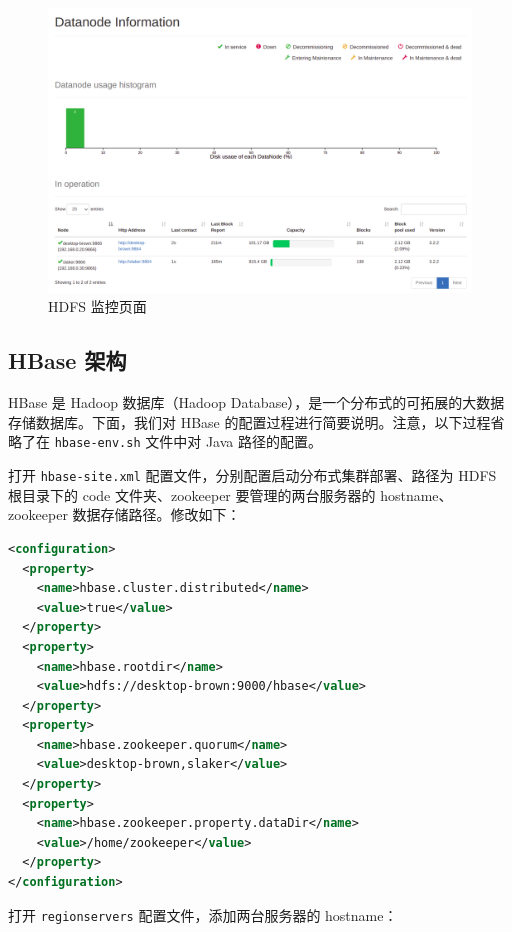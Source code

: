 \documentclass{ctexart}
\newcommand{\code}[1]{\colorbox{backcolor}{\lstinline|#1|}}
\begin{document}
    \begin{figure}[t]
        \centering
        \includegraphics[width=\textwidth]{src/archicture_hdfs-web}
        \caption{HDFS 监控页面}
        \label{fig:archicture_hdfs-web}
    \end{figure}

    \subsection{HBase 架构}\label{subsec:archicture_hbase}

    HBase 是 Hadoop 数据库（Hadoop Database），是一个分布式的可拓展的大数据存储数据库\cite{docs-hbase}。下面，我们对 HBase 的配置过程进行简要说明。注意，以下过程省略了在 \code{hbase-env.sh} 文件中对 Java 路径的配置。

    打开 \code{hbase-site.xml} 配置文件，分别配置启动分布式集群部署、路径为 HDFS 根目录下的 code 文件夹、zookeeper 要管理的两台服务器的 hostname、zookeeper 数据存储路径。修改如下：

    \begin{lstlisting}[language=XML]
<configuration>
  <property>
    <name>hbase.cluster.distributed</name>
    <value>true</value>
  </property>
  <property>
    <name>hbase.rootdir</name>
    <value>hdfs://desktop-brown:9000/hbase</value>
  </property>
  <property>
    <name>hbase.zookeeper.quorum</name>
    <value>desktop-brown,slaker</value>
  </property>
  <property>
    <name>hbase.zookeeper.property.dataDir</name>
    <value>/home/zookeeper</value>
  </property>
</configuration>
    \end{lstlisting}

    打开 \code{regionservers} 配置文件，添加两台服务器的 hostname：
\end{document}
